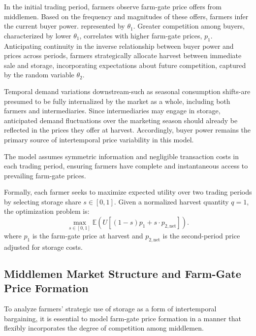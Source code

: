 In the initial trading period, farmers observe farm-gate price offers from middlemen. Based on the frequency and magnitudes of these offers, farmers infer the current buyer power. represented by $\theta_1$. Greater competition among buyers, characterized by lower $\theta_1$, correlates with higher farm-gate prices, $p_1$. Anticipating continuity in the inverse relationship between buyer power and prices across periods, farmers strategically allocate harvest between immediate sale and storage, incorporating expectations about future competition, captured by the random variable $\theta_2$.

Temporal demand variations downstream-such as seasonal consumption shifts-are presumed to be fully internalized by the market as a whole, including both farmers and intermediaries. Since intermediaries may engage in storage, anticipated demand fluctuations over the marketing season should already be reflected in the prices they offer at harvest. Accordingly, buyer power remains the primary source of intertemporal price variability in this model.

The model assumes symmetric information and negligible transaction costs in each trading period, ensuring farmers have complete and instantaneous access to prevailing farm-gate prices.

Formally, each farmer seeks to maximize expected utility over two trading periods by selecting storage share $s \in [0,1]$. Given a normalized harvest quantity $q = 1$, the optimization problem is:
\begin{equation}
\label{eq:starting objective}
\max_{s \in [0,1]} \mathbb{E} \left(U\left[ (1 - s) p_1 + s \cdot p_{2,\text{net}} \right]\right).
\end{equation}
where $p_1$ is the farm-gate price at harvest and $p_{2,\text{net}}$ is the second-period price adjusted for storage costs.



\subsection{Middlemen Market Structure and Farm-Gate Price Formation} \label{Section: Middlemen Market Structure and Farm-Gate Price Formation}
\noindent To analyze farmers' strategic use of storage as a form of intertemporal bargaining, it is essential to model farm-gate price formation in a manner that flexibly incorporates the degree of competition among middlemen.

